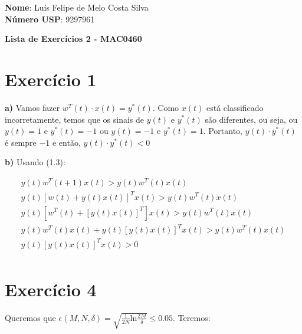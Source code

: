 \documentclass[12pt,letterpaper]{article}
\begin{document}
	
	\textbf{Nome}: Luís Felipe de Melo Costa Silva \\
	\textbf{Número USP}: 9297961 
	
	\begin{center}
		\LARGE \bf
		Lista de Exercícios 2 - MAC0460
	\end{center}
	
	\section*{Exercício 1}
	
	\textbf{a)} Vamos fazer $w^T(t) \cdot x(t) = y^*(t)$. Como $x(t)$ está classificado incorretamente, temos que os sinais de $y(t)$ e $y^*(t)$ são diferentes, ou seja, ou $y(t) = 1$ e $y^*(t) = -1$ ou $y(t) = -1$ e $y^*(t) = 1$. Portanto, $y(t) \cdot y^*(t)$ é sempre $-1$ e então, $y(t) \cdot y^*(t) < 0$
	
	\textbf{b)} Usando (1.3):
	
	\begin{equation*}
		\begin{split}
			y(t)w^T(t+1)x(t) > y(t)w^T(t)x(t) \\
			y(t)[w(t) + y(t)x(t)]^Tx(t) > y(t)w^T(t)x(t) \\
			y(t)[w^T(t) + [y(t)x(t)]^T]x(t) > y(t)w^T(t)x(t) \\
			y(t)w^T(t)x(t) + y(t)[y(t)x(t)]^Tx(t) > y(t)w^T(t)x(t) \\
			y(t)[y(t)x(t)]^Tx(t) > 0 \\
		\end{split}
	\end{equation*}
	
	\section*{Exercício 4}
	
	Queremos que $\epsilon(M, N, \delta) = \sqrt{\frac{1}{2N} \text{ln} \frac{2M}{\delta}} \leq 0.05$. Teremos:
	
\end{document}
